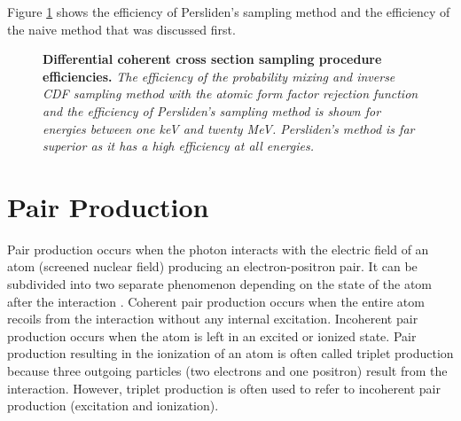 Figure \ref{fig:diff_coh_sampling_proc_eff} shows the efficiency of Persliden's 
sampling method and the efficiency of the naive method that was discussed first.
\begin{figure}[t!]
  \begin{center}
  \end{center}
  \caption{\textbf{Differential coherent cross section sampling procedure efficiencies.}
    \textit{The efficiency of the probability mixing and inverse CDF sampling 
      method with the atomic form factor rejection function and the efficiency 
      of Persliden's sampling method is shown for energies between one keV and 
      twenty MeV. Persliden's method is far superior as it has a high 
      efficiency at all energies.}}
  \label{fig:diff_coh_sampling_proc_eff}
\end{figure}

\section{Pair Production}
\label{sec:pair_production}
Pair production occurs when the photon interacts with the electric field of an
atom (screened nuclear field) producing an electron-positron pair. It can be
subdivided into two separate phenomenon depending on the state of the atom
after the interaction \citep{hubbell_pair_1980}. Coherent pair production occurs
when the entire atom recoils from the interaction without any internal 
excitation. Incoherent pair production occurs when the atom is left in an 
excited or ionized state. Pair production resulting in the ionization of an 
atom is often called triplet production because three outgoing particles (two 
electrons and one positron) result from the interaction. However, triplet 
production is often used to refer to incoherent pair production (excitation and
ionization). 

